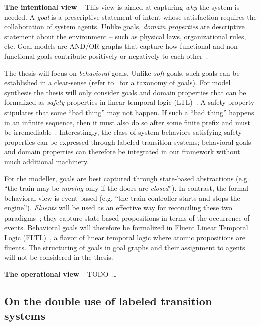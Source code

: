 
\noindent \textbf{The intentional view} -- This view is aimed at capturing \emph{why} the system is needed. A \emph{goal} is a prescriptive statement of intent whose satisfaction requires the collaboration of system agents. Unlike goals, \emph{domain properties} are descriptive statement about the environment -- such as physical laws, organizational rules, etc. Goal models are AND/OR graphs that capture how functional and non-functional goals contribute positively or negatively to each other~\cite{VanLamsweerde:2000, VanLamsweerde:2004}.

The thesis will focus on \emph{behavioral} goals. Unlike \emph{soft} goals, such goals can be established in a clear-sense (refer to~\cite{VanLamsweerde:2009} for a taxonomy of goals). For model synthesis the thesis will only consider goals and domain properties that can be formalized as \emph{safety} properties in linear temporal logic (LTL)~\cite{Manna:1992}. A safety property stipulates that some ``bad thing'' may not happen. If such a ``bad thing'' happens in an infinite sequence, then it must also do so after some finite prefix and must be irremediable~\cite{Alpern:1986, Giannakopoulou:1999}. Interestingly, the class of system behaviors satisfying safety properties can be expressed through labeled transition systems; behavioral goals and domain properties can therefore be integrated in our framework without much additional machinery.

For the modeller, goals are best captured through state-based abstractions (e.g. ``the train may be \emph{moving} only if the doors are \emph{closed}''). In contrast, the formal behavioral view is event-based (e.g. ``the train controller starts and stops the engine''). \emph{Fluents} will be used as an effective way for reconciling these two paradigms~\cite{Miller:2002}; they capture state-based propositions in terms of the occurrence of events. Behavioral goals will therefore be formalized in Fluent Linear Temporal Logic (FLTL)~\cite{Giannakopoulou:2003}, a flavor of linear temporal logic where atomic propositions are fluents. The structuring of goals in goal graphs and their assignment to agents will not be considered in the thesis.


\noindent \textbf{The operational view} -- TODO~\ldots

\subsection{On the double use of labeled transition systems}

